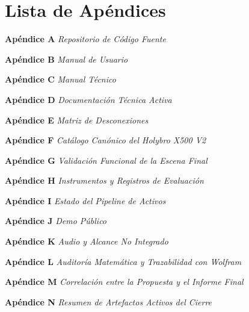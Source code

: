 \documentclass[12pt,letterpaper]{article}
\begin{document}
\section*{Lista de Apéndices}
\noindent\textbf{Apéndice A} \textit{Repositorio de Código Fuente} \cftdotfill{\cftdotsep} \pageref{apendice:A}\par
\noindent\textbf{Apéndice B} \textit{Manual de Usuario} \cftdotfill{\cftdotsep} \pageref{apendice:B}\par
\noindent\textbf{Apéndice C} \textit{Manual Técnico} \cftdotfill{\cftdotsep} \pageref{apendice:C}\par
\noindent\textbf{Apéndice D} \textit{Documentación Técnica Activa} \cftdotfill{\cftdotsep} \pageref{apendice:D}\par
\noindent\textbf{Apéndice E} \textit{Matriz de Desconexiones} \cftdotfill{\cftdotsep} \pageref{apendice:E}\par
\noindent\textbf{Apéndice F} \textit{Catálogo Canónico del Holybro X500 V2} \cftdotfill{\cftdotsep} \pageref{apendice:F}\par
\noindent\textbf{Apéndice G} \textit{Validación Funcional de la Escena Final} \cftdotfill{\cftdotsep} \pageref{apendice:G}\par
\noindent\textbf{Apéndice H} \textit{Instrumentos y Registros de Evaluación} \cftdotfill{\cftdotsep} \pageref{apendice:H}\par
\noindent\textbf{Apéndice I} \textit{Estado del Pipeline de Activos} \cftdotfill{\cftdotsep} \pageref{apendice:I}\par
\noindent\textbf{Apéndice J} \textit{Demo Público} \cftdotfill{\cftdotsep} \pageref{apendice:J}\par
\noindent\textbf{Apéndice K} \textit{Audio y Alcance No Integrado} \cftdotfill{\cftdotsep} \pageref{apendice:K}\par
\noindent\textbf{Apéndice L} \textit{Auditoría Matemática y Trazabilidad con Wolfram} \cftdotfill{\cftdotsep} \pageref{apendice:L}\par
\noindent\textbf{Apéndice M} \textit{Correlación entre la Propuesta y el Informe Final} \cftdotfill{\cftdotsep} \pageref{apendice:M}\par
\noindent\textbf{Apéndice N} \textit{Resumen de Artefactos Activos del Cierre} \cftdotfill{\cftdotsep} \pageref{apendice:N}\par

\end{document}
